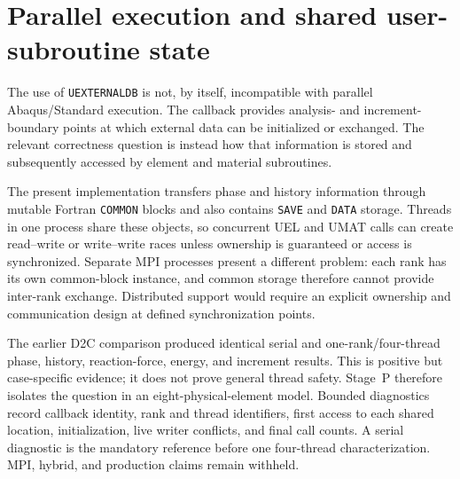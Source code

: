 \section{Parallel execution and shared user-subroutine state}
\label{sec:externaldb-parallelization}

The use of \texttt{UEXTERNALDB} is not, by itself, incompatible with parallel
Abaqus/Standard execution.  The callback provides analysis- and
increment-boundary points at which external data can be initialized or
exchanged.  The relevant correctness question is instead how that information
is stored and subsequently accessed by element and material subroutines.

The present implementation transfers phase and history information through
mutable Fortran \texttt{COMMON} blocks and also contains \texttt{SAVE} and
\texttt{DATA} storage.  Threads in one process share these objects, so
concurrent UEL and UMAT calls can create read--write or write--write races
unless ownership is guaranteed or access is synchronized.  Separate MPI
processes present a different problem: each rank has its own common-block
instance, and common storage therefore cannot provide inter-rank exchange.
Distributed support would require an explicit ownership and communication
design at defined synchronization points.

The earlier D2C comparison produced identical serial and one-rank/four-thread
phase, history, reaction-force, energy, and increment results.  This is
positive but case-specific evidence; it does not prove general thread safety.
Stage~P therefore isolates the question in an eight-physical-element model.
Bounded diagnostics record callback identity, rank and thread identifiers,
first access to each shared location, initialization, live writer conflicts,
and final call counts.  A serial diagnostic is the mandatory reference before
one four-thread characterization.  MPI, hybrid, and production claims remain
withheld.

